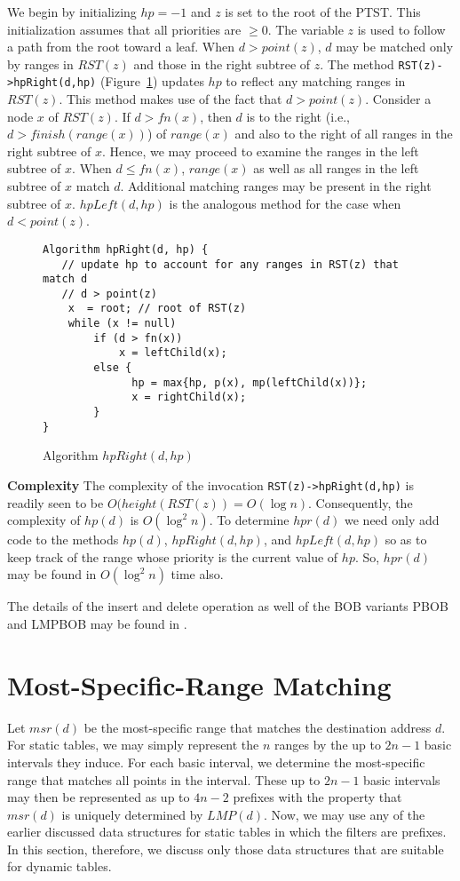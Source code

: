 We begin by initializing $hp = -1$ and $z$ is set to the root of the PTST.
This initialization assumes that all
priorities are $\geq 0$.
The variable $z$ is used to follow a path from the root toward a leaf. When $d >
point(z)$, $d$ may be  matched only by ranges in $RST(z)$ and those in
the right subtree of $z$. The method {\tt RST(z)->hpRight(d,hp)}
(Figure~\ref{fig:hpRight}) updates $hp$
to reflect any matching ranges in $RST(z)$. This method makes use of the
fact that $d > point(z)$. Consider a node $x$ of $RST(z)$. If $d > fn(x)$,
then $d$ is to the right (i.e., $d > finish(range(x))$)
of $range(x)$ and also to the right of all ranges
in the right subtree of $x$. Hence, we may proceed to examine the ranges in the
left subtree of $x$. When $d \leq fn(x)$, $range(x)$ as well as all
ranges in the left subtree of $x$ match $d$. Additional matching ranges may be
present in the right subtree of $x$.
$hpLeft(d,hp)$ is the analogous method for the case
when $d < point(z)$.


\begin{figure}[ht]
\begin{verbatim} 
Algorithm hpRight(d, hp) {
   // update hp to account for any ranges in RST(z) that match d
   // d > point(z)
    x  = root; // root of RST(z)
    while (x != null)
        if (d > fn(x))
            x = leftChild(x);
        else {
              hp = max{hp, p(x), mp(leftChild(x))}; 
              x = rightChild(x); 
        }
}
\end{verbatim}
\caption{Algorithm $hpRight(d,hp)$}
\label{fig:hpRight} 
\end{figure}


{\bf Complexity}
The complexity of the invocation {\tt RST(z)->hpRight(d,hp)}
is readily seen to be $O(height(RST(z)) = O(\log n)$. Consequently, the
complexity of $hp(d)$ is $O(\log ^2 n)$. To determine $hpr(d)$ we need only
add code to the methods $hp(d)$, $hpRight(d,hp)$, and $hpLeft(d,hp)$ so as
to keep track of the range whose priority is the current value of $hp$. So,
$hpr(d)$ may be found in $O(\log ^2 n)$ time also.

The details of the insert and delete operation as well of the BOB variants
PBOB and LMPBOB may be found in \cite{lu1}.

\section{Most-Specific-Range Matching}\label{sec:msr}
Let $msr(d)$ be the most-specific range that matches the destination address
$d$.
For static tables, we may simply represent the $n$ ranges by the up to
$2n - 1$ basic intervals they induce. For each basic interval, we determine
the most-specific range that matches all points in the interval.
These up to $2n - 1$ basic intervals may then be represented
as up to $4n - 2$ prefixes
\cite{feld} with the property that $msr(d)$ is uniquely determined by $LMP(d)$.
Now, we may use any of the earlier discussed data structures for
static tables in which the filters are prefixes. In this section,
therefore, we discuss only those data structures that are suitable for dynamic
tables.

